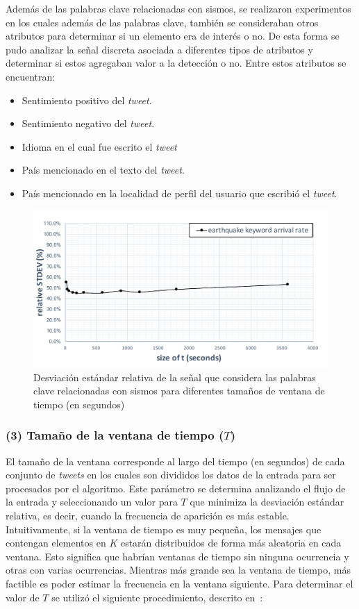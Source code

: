 	
	Además de las palabras clave relacionadas con sismos, se realizaron experimentos en los cuales además de las palabras clave, también se consideraban otros atributos para determinar si un elemento era de interés o no. 
	De esta forma se pudo analizar la señal discreta asociada a diferentes tipos de atributos y determinar si estos agregaban valor a la detección o no. 
	Entre estos atributos se encuentran:
	\begin{itemize}
	\item Sentimiento positivo del \textit{tweet}.
	\item Sentimiento negativo del \textit{tweet}.
	\item Idioma en el cual fue escrito el \textit{tweet}
	\item País mencionado en el texto del \textit{tweet}.
	\item País mencionado en la localidad de perfil del usuario que escribió el \textit{tweet}.
	\end{itemize}

	\begin{figure}[ht]
  	\centering
  	\includegraphics[trim={5 0 5 10}, clip, width=\textwidth]{imagenes/02_Poise_Analysis_WindowSize_solo.pdf}
  	\caption{Desviación estándar relativa de la señal que considera las palabras clave relacionadas con sismos para diferentes tamaños de ventana de tiempo (en segundos)}
	\label{fig:window_size}
	\end{figure}

	\subsubsection*{(3) Tamaño de la ventana de tiempo ($T$)} 
	El tamaño de la ventana corresponde al largo del tiempo (en segundos) de cada conjunto de \textit{tweets} en los cuales son divididos los datos de la entrada para ser procesados por el algoritmo.
	Este parámetro se determina analizando el flujo de la entrada y seleccionando un valor para $T$ que minimiza la desviación estándar relativa, es decir, cuando la frecuencia de aparición es más estable. 
	Intuitivamente, si la ventana de tiempo es muy pequeña, los mensajes que contengan elementos en $K$ estarán distribuidos de forma más aleatoria en cada ventana. 	
	Esto significa que habrían ventanas de tiempo sin ninguna ocurrencia y otras con varias ocurrencias.
	Mientras más grande sea la ventana de tiempo, más factible es poder estimar la frecuencia en la ventana siguiente. 
	Para determinar el valor de $T$ se utilizó el siguiente procedimiento, descrito en~\cite{guzman2013line}:

